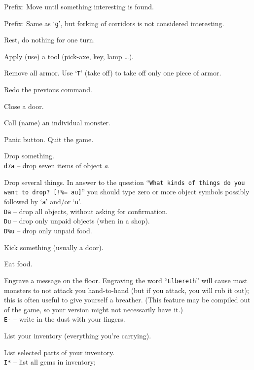 Prefix:  Move until something interesting is found.
\item[\tb{G[yuhjklbn] or <CONTROL->[yuhjklbn]}]
Prefix:  Same as `{\tt g}', but forking of corridors is not considered
interesting.
\item[\tb{.}]
Rest, do nothing for one turn.
\item[\tb{a}]
Apply (use) a tool (pick-axe, key, lamp \ldots).
\item[\tb{A}]
Remove all armor.  Use `{\tt T}' (take off) to take off only one piece of
armor.
\item[\tb{\^{}A}]
Redo the previous command.
\item[\tb{c}]
Close a door.
\item[\tb{C}]
Call (name) an individual monster.
\item[\tb{\^{}C}]
Panic button.  Quit the game.
\item[\tb{d}]
Drop something.\\
{\tt d7a} -- drop seven items of object
{\it a}.
\item[\tb{D}]
Drop several things.  In answer to the question
``{\tt What kinds of things do you want to drop? [!\%= au]}''
you should type zero or more object symbols possibly followed by
`{\tt a}' and/or `{\tt u}'.\\
{\tt Da}  -- drop all objects, without asking for confirmation.\\
{\tt Du}  -- drop only unpaid objects (when in a shop).\\
{\tt D\%u} -- drop only unpaid food.
\item[\tb{\^{}D}]
Kick something (usually a door).
\item[\tb{e}]
Eat food.
\item[\tb{E}]
Engrave a message on the floor.
Engraving the word ``{\tt Elbereth}'' will cause most monsters to not attack
you hand-to-hand (but if you attack, you will rub it out); this is
often useful to give yourself a breather.  (This feature may be compiled out
of the game, so your version might not necessarily have it.)\\
{\tt E-} -- write in the dust with your fingers.
\item[\tb{i}]
List your inventory (everything you're carrying).
\item[\tb{I}]
List selected parts of your inventory.\\
{\tt I*} -- list all gems in inventory;\\
